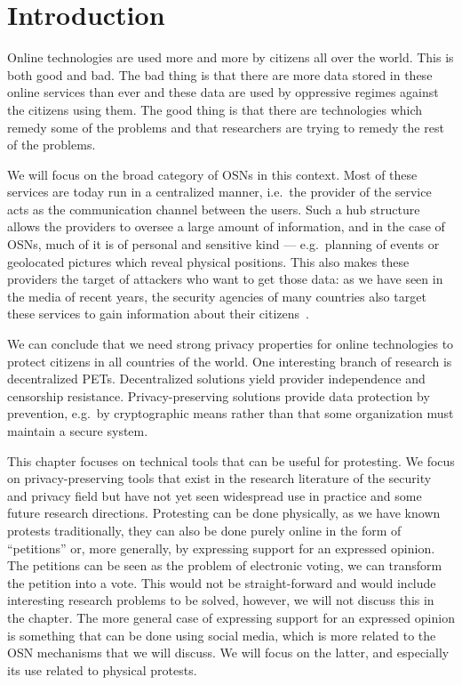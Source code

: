 \section{Introduction}
\label{Introduction}

Online technologies are used more and more by citizens all over the world.
This is both good and bad.
The bad thing is that there are more data stored in these online services than 
ever and these data are used by oppressive regimes against the citizens using 
them.
The good thing is that there are technologies which remedy some of the problems 
and that researchers are trying to remedy the rest of the problems.

We will focus on the broad category of \acp{OSN} in this context.
Most of these services are today run in a centralized manner, i.e.\ the 
provider of the service acts as the communication channel between the users.
Such a hub structure allows the providers to oversee a large amount of 
information, and in the case of \acp{OSN}, much of it is of personal and 
sensitive kind ---  e.g.\ planning of events or geolocated pictures which 
reveal physical positions.
This also makes these providers the target of attackers who want to get those 
data:
as we have seen in the media of recent years, the security agencies of many 
countries also target these services to gain information about their 
citizens~\cite{Prism}.

We can conclude that we need strong privacy properties for online technologies 
to protect citizens in all countries of the world.
One interesting branch of research is decentralized \acp{PET}.
Decentralized solutions yield provider independence and censorship resistance.
Privacy-preserving solutions provide data protection by prevention, e.g.\ by 
cryptographic means rather than that some organization must maintain a secure 
system.

This chapter focuses on technical tools that can be useful for protesting.
We focus on privacy-preserving tools that exist in the research literature of 
the security and privacy field but have not yet seen widespread use in practice 
and some future research directions.
Protesting can be done physically, as we have known protests traditionally, 
they can also be done purely online in the form of \enquote{petitions} or, more 
generally, by expressing support for an expressed opinion.
The petitions can be seen as the problem of electronic voting, we can transform 
the petition into a vote.
This would not be straight-forward and would include interesting research 
problems to be solved, however, we will not discuss this in the chapter.
The more general case of expressing support for an expressed opinion is 
something that can be done using social media, which is more related to the 
\ac{OSN} mechanisms that we will discuss.
We will focus on the latter, and especially its use related to physical 
protests.

